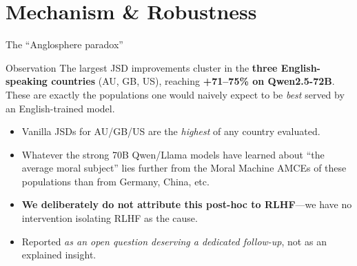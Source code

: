 \documentclass[10pt,aspectratio=169]{beamer}
\begin{document}
\section{Mechanism \& Robustness}

\begin{frame}{The ``Anglosphere paradox''}
  \begin{block}{Observation}
    The largest JSD improvements cluster in the \textbf{three English-speaking countries} (AU, GB, US), reaching \textbf{+71--75\% on Qwen2.5-72B}. These are exactly the populations one would naively expect to be \emph{best} served by an English-trained model.
  \end{block}
  \begin{itemize}
    \item Vanilla JSDs for AU/GB/US are the \emph{highest} of any country evaluated.
    \item Whatever the strong 70B Qwen/Llama models have learned about ``the average moral subject'' lies further from the Moral Machine AMCEs of these populations than from Germany, China, etc.
    \item \textbf{We deliberately do not attribute this post-hoc to RLHF}---we have no intervention isolating RLHF as the cause.
    \item Reported \emph{as an open question deserving a dedicated follow-up}, not as an explained insight.
  \end{itemize}
\end{frame}
\end{document}
